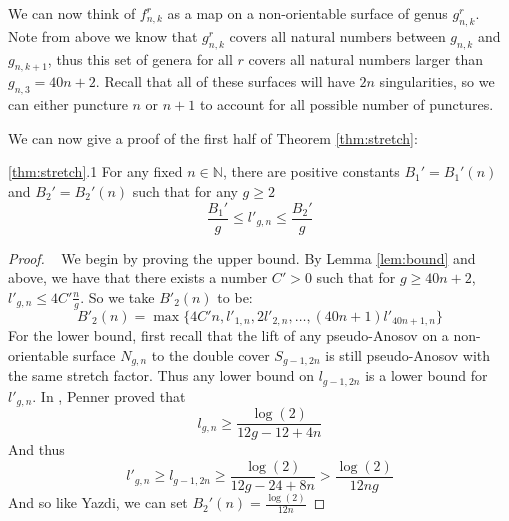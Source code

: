 We can now think of $f^r_{n,k}$ as a map on a non-orientable surface of genus $g^r_{n,k}$. Note from above we know that $g^r_{n,k}$ covers all natural numbers between $g_{n,k}$ and $g_{n,k+1}$, thus this set of genera for all $r$ covers all natural numbers larger than $g_{n,3} = 40n + 2$. Recall that all of these surfaces will have $2n$ singularities, so we can either puncture $n$ or $n + 1$ to account for all possible number of punctures.

We can now give a proof of the first half of Theorem \ref{thm:stretch}:

\begin{manualtheorem}{\ref{thm:stretch}.1}
For any fixed $n \in \mathbb{N}$, there are positive constants $B_1' = B_1'(n)$ and $B_2' = B_2'(n)$ such that for any $g \geq 2$
$$\frac{B_1'}{g} \leq l'_{g,n} \leq \frac{B_2'}{g}$$
\end{manualtheorem}
\begin{proof}
    ~
    We begin by proving the upper bound. By Lemma \ref{lem:bound} and above, we have that there exists a number $C' > 0$ such that for $g \geq 40n + 2$, $l'_{g,n} \leq 4C'\frac{n}{g}$. So we take $B'_2(n)$ to be:
    $$B'_2(n) = \max\{4C'n, l'_{1,n}, 2l'_{2,n}, \dots, (40n + 1)l'_{40n+1,n}\}$$
    For the lower bound, first recall that the lift of any pseudo-Anosov on a non-orientable surface $N_{g,n}$ to the double cover $S_{g-1,2n}$ is still pseudo-Anosov with the same stretch factor. Thus any lower bound on $l_{g-1,2n}$ is a lower bound for $l'_{g,n}$. In \cite{penner1991bounds}, Penner proved that
    $$l_{g,n} \geq \frac{\log(2)}{12g - 12 + 4n}$$
    And thus $$l'_{g,n} \geq l_{g-1,2n} \geq \frac{\log(2)}{12g - 24 + 8n} > \frac{\log(2)}{12ng}$$
    And so like Yazdi, we can set $B_2'(n) = \frac{\log(2)}{12n}$
\end{proof}
